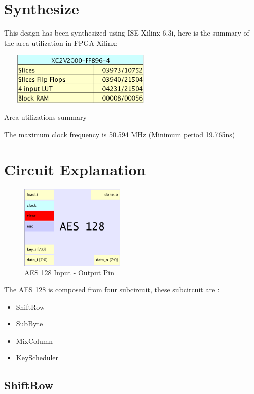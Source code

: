 \documentclass[a4paper,12pt]{report}
\begin{document}
\section{Synthesize}

This design has been synthesized using ISE Xilinx 6.3i, here is the
summary of the area utilization in FPGA Xilinx:

\begin{table}[H]
\center
\includegraphics[width=8cm,height=2.5cm]{area.eps}
\caption{Area utilizations summary}
\label{area}
\end{table}

The maximum clock frequency is 50.594 MHz (Minimum period 19.765ns)

\section{Circuit Explanation}

\begin{figure}[H]
\center
\includegraphics[width=5cm,height=4cm]{aes128block.eps}
\caption{AES 128 Input - Output Pin}
\label{aes128block}
\end{figure}

The AES 128 is composed from four subcircuit, these subcircuit are :
\begin{itemize}
\item ShiftRow
\item SubByte
\item MixColumn
\item KeyScheduler
\end{itemize}

\subsection{ShiftRow}
\end{document}
